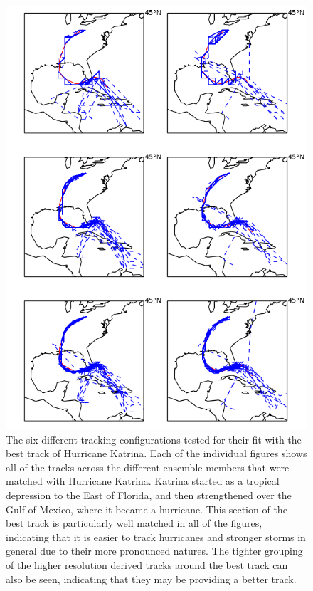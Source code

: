 \documentclass[pdftex,12pt,a4paper]{report}
\begin{document}
\begin{figure}[hbp]
    \centering
    \includegraphics[width=0.9\linewidth]{figures/katrina_six_tracking_configs}
    \caption{The six different tracking configurations tested for their fit with the best track of
        Hurricane Katrina.  Each of the individual figures shows all of the tracks across the
        different ensemble members that were matched with Hurricane Katrina. Katrina started as a
        tropical depression to the East of Florida, and then strengthened over the Gulf of Mexico,
        where it became a hurricane. This section of the best track is particularly well matched in all
        of the figures, indicating that it is easier to track hurricanes and stronger storms in general due
        to their more pronounced natures. The tighter grouping of the higher resolution derived tracks
        around the best track can also be seen, indicating that they may be providing a better track. }
    \label{fig:katrina_six_tracking_configs}
\end{figure}
\end{document}

